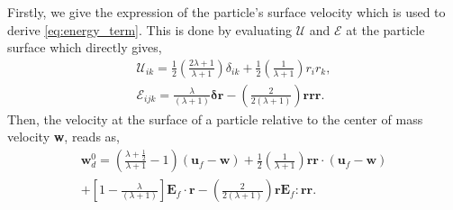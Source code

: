Firstly, we give the expression of the particle's surface velocity which is used to derive \ref{eq:energy_term}. 
This is done by evaluating $\mathcal{U}$ and $\mathcal{E}$ at the particle surface which directly gives, 
\begin{align}
    \mathcal{U}_{ik} = 
    \frac{1}{2}\left(\frac{2\lambda + 1}{\lambda +1}\right)
    \delta_{ik} 
    + 
    \frac{1}{2}\left(\frac{1}{\lambda +1}\right)
    r_ir_k,  \\
    \mathcal{E}_{ijk}
    = 
    \frac{\lambda}{(\lambda + 1)}
    \bm\delta\textbf{r}
    -\left(\frac{2}{2(\lambda +1 )} \right) \textbf{rrr}. 
\end{align}
Then, the velocity at the surface of a particle relative to the center of mass velocity \textbf{w}, reads as, 
\begin{multline}
    \textbf{w}_d^0 
    = \left(\frac{\lambda + \frac{1}{2}}{\lambda +1} - 1\right)
    (\textbf{u}_f - \textbf{w}) 
    + 
    \frac{1}{2}\left(\frac{1}{\lambda +1}\right)
    \textbf{rr} \cdot (\textbf{u}_f - \textbf{w})  \\
    + \left[1-\frac{\lambda}{(\lambda + 1)}\right]\textbf{E}_f\cdot\textbf{r}
    -\left(\frac{2}{2(\lambda +1 )} \right) \textbf{r} \textbf{E}_f:\textbf{rr}. 
\end{multline}


